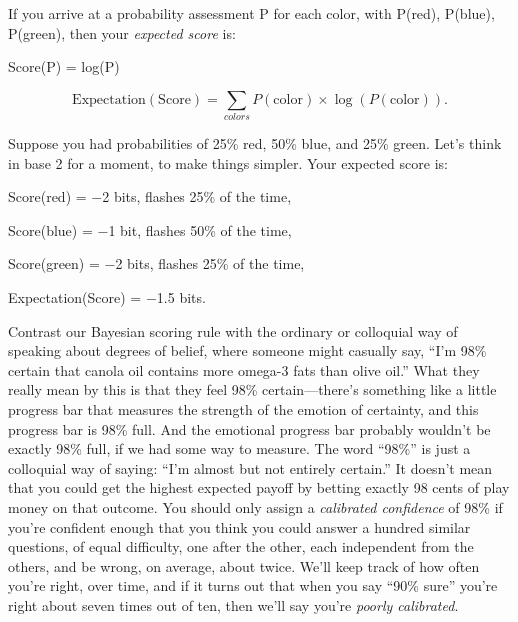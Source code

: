 {
 If you arrive at a probability assessment P for each color, with
P(red), P(blue), P(green), then your \textit{expected score} is:}

{\centering
 Score(P) = log(P)
\par}


\bigskip

\begin{equation*}
  \mathrm{Expectation}(\mathrm{Score}) = \sum_{colors}P(\mathrm{color})\times\log(P(\mathrm{color})).
\end{equation*}


\bigskip

{
 Suppose you had probabilities of 25\% red, 50\% blue, and 25\%
green. Let's think in base 2 for a moment, to make
things simpler. Your expected score is:}

{\centering
 Score(red) = $-$2 bits, flashes 25\% of the time,
\par}


\bigskip

{\centering
 Score(blue) = $-$1 bit, flashes 50\% of the time,
\par}


\bigskip

{\centering
 Score(green) = $-$2 bits, flashes 25\% of the time,
\par}


\bigskip

{\centering
 Expectation(Score) = $-$1.5 bits.
\par}


\bigskip

{
 Contrast our Bayesian scoring rule with the ordinary or colloquial
way of speaking about degrees of belief, where someone might casually
say, ``I'm 98\% certain that canola
oil contains more omega-3 fats than olive oil.'' What
they really mean by this is that they feel 98\%
certain---there's something like a little progress bar
that measures the strength of the emotion of certainty, and this
progress bar is 98\% full. And the emotional progress bar probably
wouldn't be exactly 98\% full, if we had some way to
measure. The word ``98\%'' is just a
colloquial way of saying: ``I'm almost
but not entirely certain.'' It
doesn't mean that you could get the highest expected
payoff by betting exactly 98 cents of play money on that outcome. You
should only assign a \textit{calibrated confidence} of 98\% if
you're confident enough that you think you could answer
a hundred similar questions, of equal difficulty, one after the other,
each independent from the others, and be wrong, on average, about
twice. We'll keep track of how often
you're right, over time, and if it turns out that when
you say ``90\% sure''
you're right about seven times out of ten, then
we'll say you're \textit{poorly
calibrated}.}

